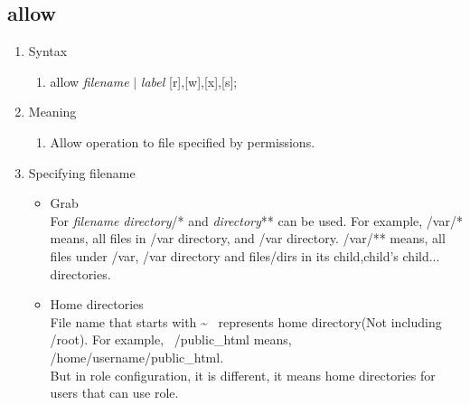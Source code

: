 \documentclass{article}
\begin{document}
\subsection{allow}\label{section:allow}
 \begin{enumerate}
  \item Syntax
	\begin{enumerate}
	 \item allow {\it filename} $\mid$ {\it label} [r],[w],[x],[s];
	\end{enumerate}
  \item Meaning\\
	\begin{enumerate}
	 \item  Allow operation to file specified by permissions. 
	\end{enumerate}
  \item Specifying filename\\
	\begin{itemize}
	 \item Grab\\
	       For {\it filename} {\it directory}/* and {\it directory}** can
	be used.  For example, /var/* means, all files in /var
	directory, and /var directory. /var/** means, all files under
	/var, /var directory and files/dirs in its
	child,child's child... 	directories.
	 \item Home directories\\
	       File name that starts with  \textasciitilde ~ represents
	       home directory(Not including /root).
	       For example, ~/public\_html means,
	       /home/username/public\_html.\\
	       But in role configuration, it is different, it means home directories for users that can use role.

	\end{itemize}


\end{enumerate}
\end{document}
